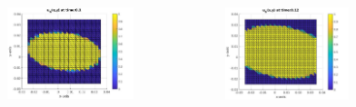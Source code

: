 \documentclass[9pt]{beamer}
\begin{document}
\begin{frame}
\begin{columns}
\begin{column}{0.25\textwidth}
			\begin{figure}[h]
				\includegraphics[width=\textwidth]{tc1-2/010.jpg}
			\end{figure}
		\end{column}
		\begin{column}{0.25\textwidth}
			\begin{figure}[h]
				\includegraphics[width=\textwidth]{tc1-2/012.jpg}
			\end{figure}
		\end{column}
		\begin{column}{0.25\textwidth}
			\begin{figure}[h]

\end{figure}
\end{column}
\end{columns}
\end{frame}
\end{document}
